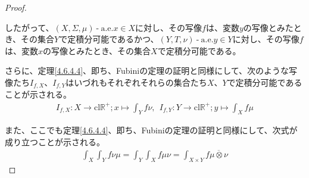 \documentclass[dvipdfmx]{jsarticle}
\begin{document}
\begin{proof}
\begin{itemize}
\end{itemize}
したがって、$(X,\varSigma,\mu) \ \text{-} \ \mathrm{a.e.}x \in X$に対し、その写像$f$は、変数$y$の写像とみたとき、その集合$Y$で定積分可能であるかつ、$(Y,T,\nu) \ \text{-} \ \mathrm{a.e.}y \in Y$に対し、その写像$f$は、変数$x$の写像とみたとき、その集合$X$で定積分可能である。\par
さらに、定理\ref{4.6.4.4}、即ち、Fubiniの定理の証明と同様にして、次のような写像たち$I_{f,X}$、$I_{f,Y}$はいづれもそれぞれそれらの集合たち$X$、$Y$で定積分可能であることが示される。
\begin{align*}
I_{f,X}:X \rightarrow \mathrm{cl}\mathbb{R}^{+};x \mapsto \int_{Y} {f\nu},\ \ I_{f,Y}:Y \rightarrow \mathrm{cl}\mathbb{R}^{+};y \mapsto \int_{X} {f\mu}
\end{align*}\par
また、ここでも定理\ref{4.6.4.4}、即ち、Fubiniの定理の証明と同様にして、次式が成り立つことが示される。
\begin{align*}
\int_{X} {\int_{Y} {f\nu}\mu} = \int_{Y} {\int_{X} {f\mu}\nu} = \int_{X \times Y} {f\overline{\mu \otimes \nu}}
\end{align*}
\end{proof}
\end{document}
